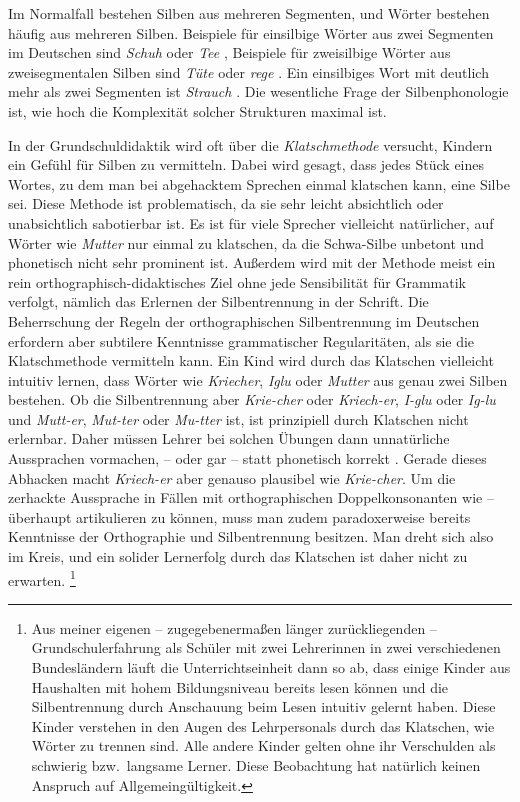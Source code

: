 Im Normalfall bestehen Silben aus mehreren Segmenten, und Wörter bestehen häufig aus mehreren Silben.
Beispiele für einsilbige Wörter aus zwei Segmenten im Deutschen sind \textit{Schuh} \textipa{[Su:]} oder \textit{Tee} \textipa{[te:]}, Beispiele für zweisilbige Wörter aus zweisegmentalen Silben sind \textit{Tüte} \textipa{[ty:t@]} oder \textit{rege} \textipa{[Ke:g@]}.
Ein einsilbiges Wort mit deutlich mehr als zwei Segmenten ist \textit{Strauch} \textipa{[StK\t{aO}X]}. 
Die wesentliche Frage der Silbenphonologie ist, wie hoch die Komplexität solcher Strukturen maximal ist.


In der Grundschuldidaktik wird oft über die \textit{Klatschmethode} versucht, Kindern ein Gefühl für Silben zu vermitteln.
Dabei wird gesagt, dass jedes Stück eines Wortes, zu dem man bei abgehacktem Sprechen einmal klatschen kann, eine Silbe sei.
Diese Methode ist problematisch, da sie sehr leicht absichtlich oder unabsichtlich sabotierbar ist.
Es ist für viele Sprecher vielleicht natürlicher, auf Wörter wie \textit{Mutter} \textipa{[mUt5]} nur einmal zu klatschen, da die Schwa-Silbe unbetont und phonetisch nicht sehr prominent ist.
Außerdem wird mit der Methode meist ein rein orthographisch-didaktisches Ziel ohne jede Sensibilität für Grammatik verfolgt, nämlich das Erlernen der Silbentrennung in der Schrift.
Die Beherrschung der Regeln der orthographischen Silbentrennung im Deutschen erfordern aber subtilere Kenntnisse grammatischer Regularitäten, als sie die Klatschmethode vermitteln kann.
Ein Kind wird durch das Klatschen vielleicht intuitiv lernen, dass Wörter wie \textit{Kriecher}, \textit{Iglu} oder \textit{Mutter} aus genau zwei Silben bestehen.
Ob die Silbentrennung aber \textit{Krie-cher} oder \textit{Kriech-er}, \textit{I-glu} oder \textit{Ig-lu} und \textit{Mutt-er}, \textit{Mut-ter} oder \textit{Mu-tter} ist, ist prinzipiell durch Klatschen nicht erlernbar.
Daher müssen Lehrer bei solchen Übungen dann unnatürliche Aussprachen vormachen, \zB \textipa{[mUt]} -- \textipa{[ta]} oder gar \textipa{[mUt]} -- \textipa{[tEK]} statt phonetisch korrekt \textipa{[mU.t5]}.
Gerade dieses Abhacken macht \textit{Kriech-er} aber genauso plausibel wie \textit{Krie-cher}.
Um die zerhackte Aussprache in Fällen mit orthographischen Doppelkonsonanten wie \textipa{[mUt]} -- \textipa{[ta]} überhaupt artikulieren zu können, muss man zudem paradoxerweise bereits Kenntnisse der Orthographie und Silbentrennung besitzen.
Man dreht sich also im Kreis, und ein solider Lernerfolg durch das Klatschen ist daher nicht zu erwarten.%
\footnote{Aus meiner eigenen -- zugegebenermaßen länger zurückliegenden -- Grundschulerfahrung als Schüler mit zwei Lehrerinnen in zwei verschiedenen Bundesländern läuft die Unterrichtseinheit dann so ab, dass einige Kinder aus Haushalten mit hohem Bildungsniveau bereits lesen können und die Silbentrennung durch Anschauung beim Lesen intuitiv gelernt haben.
Diese Kinder verstehen in den Augen des Lehrpersonals durch das Klatschen, wie Wörter zu trennen sind.
Alle andere Kinder gelten ohne ihr Verschulden als schwierig bzw.\ langsame Lerner.
Diese Beobachtung hat natürlich keinen Anspruch auf Allgemeingültigkeit.}

